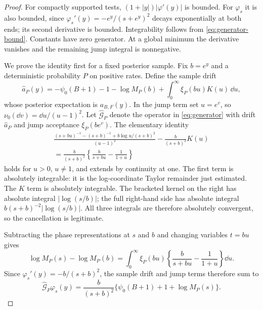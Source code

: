 \begin{proof}
For compactly supported tests, $(1+|y|)|\varphi'(y)|$ is bounded.
For $\varphi_s$ it is also bounded, since $\varphi_s'(y)=-e^y/(s+e^y)^2$ decays exponentially at both ends; its second derivative is bounded.
Integrability follows from \eqref{eq:generator-bound}.
Constants have zero generator.
At a global minimum the derivative vanishes and the remaining jump integral is nonnegative.

We prove the identity first for a fixed posterior sample.
Fix $b=e^y$ and a deterministic probability $P$ on positive rates.
Define the sample drift
\[
 \widehat a_P(y)
 =-\psi_0(B+1)-1-\log M_P(b)
       +\int_0^\infty\xi_P(bu)K(u)\,\dd u,
\]
whose posterior expectation is $a_{B,F}(y)$.
In the jump term set $u=e^v$, so $\nu_0(\dd v)=\dd u/(u-1)^2$.
Let $\widehat{\mathcal G}_P$ denote the operator in \eqref{eq:generator} with drift $\widehat a_P$ and jump acceptance $\xi_P(be^v)$.
The elementary identity
\begin{multline}
 \frac{(s+bu)^{-1}-(s+b)^{-1}
                  +b\log u/(s+b)^2}{(u-1)^2}
       -\frac{b}{(s+b)^2}K(u)\\
 =\frac{b}{(s+b)^2}
          \left\{\frac{b}{s+bu}-\frac1{1+u}\right\}
 \label{eq:direct-resolvent-cancellation}
\end{multline}
holds for $u>0$, $u\ne1$, and extends by continuity at one.
The first term is absolutely integrable: it is the log-coordinate Taylor remainder just estimated.
The $K$ term is absolutely integrable.
The bracketed kernel on the right has absolute integral $|\log(s/b)|$; the full right-hand side has absolute integral $b(s+b)^{-2}|\log(s/b)|$.
All three integrals are therefore absolutely convergent, so the cancellation is legitimate.

Subtracting the phase representations at $s$ and $b$ and changing variables $t=bu$ gives
\[
 \log M_P(s)-\log M_P(b)
 =\int_0^\infty\xi_P(bu)
       \left\{\frac{b}{s+bu}-\frac1{1+u}\right\}\dd u.
\]
Since $\varphi_s'(y)=-b/(s+b)^2$, the sample drift and jump terms therefore sum to
\begin{equation}
 \widehat{\mathcal G}_P\varphi_s(y)
 =\frac{b}{(s+b)^2}
            \{\psi_0(B+1)+1+\log M_P(s)\}.
 \label{eq:sample-resolvent}
\end{equation}


\end{proof}

